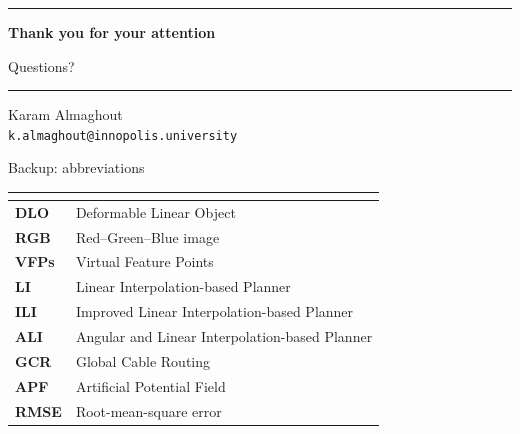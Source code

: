 \documentclass[aspectratio=169,10pt]{beamer}
\begin{document}
\begin{frame}[plain]
  \vspace*{1.65cm}
  \begin{center}
    {\color{IUBlue}\rule{0.54\textwidth}{1.0pt}}\par
    \vspace{0.48cm}
    {\Huge\bfseries Thank you for your attention}\par
    \vspace{0.40cm}
    {\Large Questions?}\par
    \vspace{0.58cm}
    {\color{IUBlue}\rule{0.54\textwidth}{1.0pt}}\par
    \vspace{0.42cm}
    {\large Karam Almaghout}\\[0.18cm]
    {\small\color{MidGray}\texttt{k.almaghout@innopolis.university}}
  \end{center}
\end{frame}

\appendix

\begin{frame}[t]{Backup: abbreviations}
  \small
  \renewcommand{\arraystretch}{1.24}
  \begin{tabularx}{0.94\textwidth}{>{\bfseries}p{1.7cm}Y}
    \toprule
     & \\
    \midrule
    DLO & Deformable Linear Object\\
    RGB & Red--Green--Blue image\\
    VFPs & Virtual Feature Points\\
    LI & Linear Interpolation-based Planner\\
    ILI & Improved Linear Interpolation-based Planner\\
    ALI & Angular and Linear Interpolation-based Planner\\
    GCR & Global Cable Routing\\
    APF & Artificial Potential Field\\
    RMSE & Root-mean-square error\\
    \bottomrule
  \end{tabularx}
\end{frame}
\end{document}
